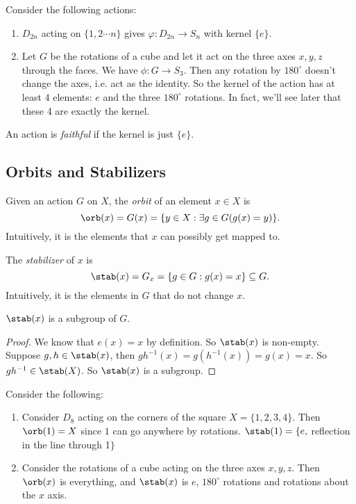 \documentclass[a4paper]{article}
\begin{document}
  \begin{eg}
    Consider the following actions:
    \begin{enumerate}
      \item $D_{2n}$ acting on $\{1, 2\cdots n\}$ gives $\varphi: D_{2n}\to S_n$ with kernel $\{e\}$.
      \item Let $G$ be the rotations of a cube and let it act on the three axes $x, y, z$ through the faces. We have $\phi: G\to S_3$. Then any rotation by $180^\circ$ doesn't change the axes, i.e. act as the identity. So the kernel of the action has at least 4 elements: $e$ and the three $180^\circ$ rotations. In fact, we'll see later that these 4 are exactly the kernel.
    \end{enumerate}
  \end{eg}

  \begin{defi}
    An action is \emph{faithful} if the kernel is just $\{e\}$.
  \end{defi}

  \subsection{Orbits and Stabilizers}
  \begin{defi}
    Given an action $G$ on $X$, the \emph{orbit} of an element $x\in X$ is 
    \[
      \orb (x) = G(x) = \{y\in X: \exists g\in G(g(x) = y)\}.
    \]
    Intuitively, it is the elements that $x$ can possibly get mapped to.
  \end{defi}
  \begin{defi}
    The \emph{stabilizer} of $x$ is
    \[
      \stab(x) = G_x = \{g\in G: g(x) = x\}\subseteq G.
    \]
    Intuitively, it is the elements in $G$ that do not change $x$.
  \end{defi}

  \begin{lemma}
    $\stab(x)$ is a subgroup of $G$.
  \end{lemma}

  \begin{proof}
    We know that $e(x) = x$ by definition. So $\stab(x)$ is non-empty. Suppose $g, h\in \stab(x)$, then $gh^{-1}(x) = g(h^{-1}(x)) = g(x) = x$. So $gh^{-1}\in \stab (X)$. So $\stab (x)$ is a subgroup.
  \end{proof}

  \begin{eg}
    Consider the following:
    \begin{enumerate}
      \item Consider $D_8$ acting on the corners of the square $X = \{1, 2, 3, 4\}$. Then $\orb(1) = X$ since $1$ can go anywhere by rotations. $\stab(1) = \{e, $ reflection in the line through 1$\}$
      \item Consider the rotations of a cube acting on the three axes $x, y, z$. Then $\orb(x)$ is everything, and $\stab(x)$ is $e$, $180^\circ$ rotations and rotations about the $x$ axis.
    \end{enumerate}
  \end{eg}
\end{document}
